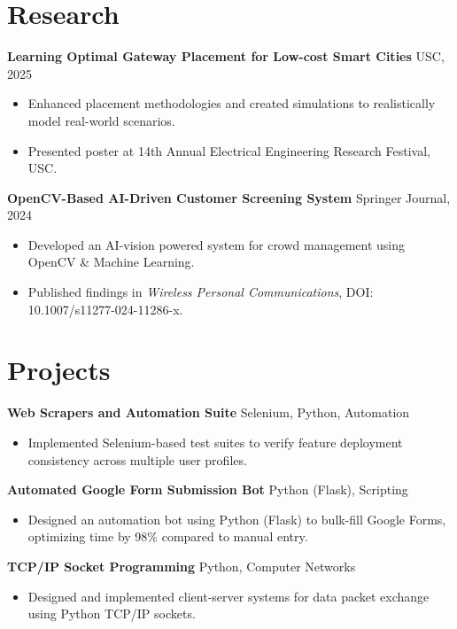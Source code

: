 \documentclass[letterpaper,10pt]{article}
\begin{document}
\section*{Research}
    \textbf{Learning Optimal Gateway Placement for Low-cost Smart Cities} \hfill USC, 2025
    \begin{itemize}[leftmargin=*]
        \item Enhanced placement methodologies and created simulations to realistically model real-world scenarios.
        \item Presented poster at 14th Annual Electrical Engineering Research Festival, USC.
    \end{itemize}
    
    \textbf{OpenCV-Based AI-Driven Customer Screening System} \hfill Springer Journal, 2024
    \begin{itemize}[leftmargin=*]
        \item Developed an AI-vision powered system for crowd management using OpenCV \& Machine Learning.
        \item Published findings in \textit{Wireless Personal Communications}, DOI: 10.1007/s11277-024-11286-x.
    \end{itemize}
\section*{Projects}
    \textbf{Web Scrapers and Automation Suite} \hfill Selenium, Python, Automation
    \begin{itemize}[leftmargin=*]
        \item Implemented Selenium-based test suites to verify feature deployment consistency across multiple user profiles.
    \end{itemize}

    \textbf{Automated Google Form Submission Bot} \hfill Python (Flask), Scripting
    \begin{itemize}[leftmargin=*]
        \item Designed an automation bot using Python (Flask) to bulk-fill Google Forms, optimizing time by 98\% compared to manual entry.
    \end{itemize}

    \textbf{TCP/IP Socket Programming} \hfill Python, Computer Networks
    \begin{itemize}[leftmargin=*]
        \item Designed and implemented client-server systems for data packet exchange using Python TCP/IP sockets.
    \end{itemize}
\end{document}

